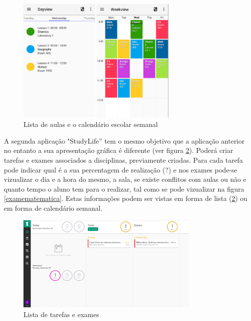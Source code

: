 \documentclass[11pt, twoside]{report}
\begin{document}
	\begin{figure}[H] 
		\centering 
		\includegraphics[width=0.7\textwidth,height=0.7\textheight,keepaspectratio]{image/estadodearte/dayweekview}
		\caption{Lista de aulas e o calendário escolar semanal}
		\label{dayweekview}
	\end{figure}
	
	A segunda aplicação "StudyLife'' tem o mesmo objetivo que a aplicação anterior no entanto a sua apresentação gráfica é diferente (ver figura \ref{listastudylife}). Poderá criar tarefas e exames associados a disciplinas, previamente criadas. Para cada tarefa pode indicar qual é a sua percentagem de realização (?) e nos exames pode-se vizualizar o dia e a hora do mesmo, a sala, se existe conflitos com aulas ou não e quanto tempo o aluno tem para o realizar, tal como se pode vizualizar na figura \ref{examematematica}. Estas informações podem ser vistas em forma de lista (\ref{listastudylife}) ou em forma de calendário semanal.	
	
	\begin{figure}[H] 
		\centering 
		\includegraphics[width=0.8\textwidth,height=0.8\textheight,keepaspectratio]{image/estadodearte/calendario}
		\caption{Lista de tarefas e exames}
		\label{listastudylife}
	\end{figure}
	
\end{document}
